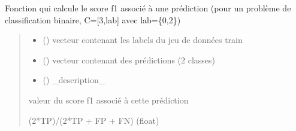 \documentclass[letterpaper,10pt,french]{sphinxmanual}
\begin{document}

\begin{fulllineitems}
\label{\detokenize{methode_fait_maison:methode_fait_maison.f1}}
\pysigstartsignatures
{}
\pysigstopsignatures
\sphinxAtStartPar
Fonction qui calcule le score f1 associé à une prédiction (pour un problème de classification binaire, C={[}3,lab{]} avec lab=\{0,2\})
\begin{quote}\begin{description}
\begin{itemize}
\item {} 
\sphinxAtStartPar
{} () \textendash{} vecteur contenant les labels du jeu de données train

\item {} 
\sphinxAtStartPar
{} () \textendash{} vecteur contenant des prédictions (2 classes)

\item {} 
\sphinxAtStartPar
{} () \textendash{} \_description\_

\end{itemize}

\sphinxAtStartPar
valeur du score f1 associé à cette prédiction

\sphinxAtStartPar
(2*TP)/(2*TP + FP + FN) (float)

\end{description}\end{quote}

\end{fulllineitems}

\end{document}
